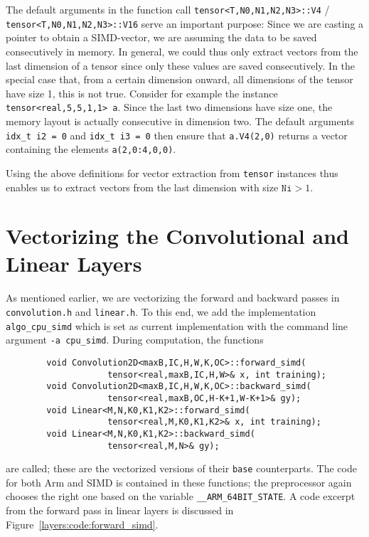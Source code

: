 \documentclass{article}
\numberwithin{equation}{section}
\numberwithin{figure}{section}
\numberwithin{table}{section}
\begin{document}
    The default arguments in the function call \texttt{tensor<T,N0,N1,N2,N3>::V4} /
    \texttt{tensor<T,N0,N1,N2,N3>::V16} serve an important purpose: Since we are casting a pointer to obtain a
    SIMD-vector, we are assuming the data to be saved consecutively in memory. In general, we could thus only extract vectors
    from the last dimension of a tensor since only these values are saved consecutively. In the special case that, from a
    certain dimension onward, all dimensions of the tensor have size 1, this is not true. Consider for example the instance
    \texttt{tensor<real,5,5,1,1> a}. Since the last two dimensions have size one, the memory layout is actually
    consecutive in dimension two. The default arguments \texttt{idx_t i2 = 0} and \texttt{idx_t i3 = 0}
    then ensure that \texttt{a.V4(2,0)} returns a vector containing the elements \texttt{a(2,0:4,0,0)}.
    
    Using the above definitions for vector extraction from \texttt{tensor} instances thus enables us to extract
    vectors from the last dimension with size $\texttt{Ni} > 1$.
    
    \section{Vectorizing the Convolutional and Linear Layers}
    \label{sec:layers}

    As mentioned earlier, we are vectorizing the forward and backward passes in \texttt{convolution.h} and \texttt{linear.h}.
    To this end, we add the implementation \texttt{algo_cpu_simd} which is set as current implementation with the
    command line argument \texttt{-a cpu\_simd}. During computation, the functions

    \begin{verbatim}
        void Convolution2D<maxB,IC,H,W,K,OC>::forward_simd(
                    tensor<real,maxB,IC,H,W>& x, int training);
        void Convolution2D<maxB,IC,H,W,K,OC>::backward_simd(
                    tensor<real,maxB,OC,H-K+1,W-K+1>& gy);
        void Linear<M,N,K0,K1,K2>::forward_simd(
                    tensor<real,M,K0,K1,K2>& x, int training);
        void Linear<M,N,K0,K1,K2>::backward_simd(
                    tensor<real,M,N>& gy);
    \end{verbatim}

    are called; these are the vectorized versions of their \texttt{base} counterparts. The code for both Arm and SIMD is
    contained in these functions; the preprocessor again chooses the right one based on the variable
    \texttt{__ARM_64BIT_STATE}. A code excerpt from the forward pass in linear layers is discussed in
    Figure~\ref{layers:code:forward_simd}.
\end{document}

